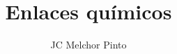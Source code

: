 \documentclass[12pt,addpoints,answers]{guia}
\title{Enlaces químicos}
\author{JC Melchor Pinto}
\begin{document}
\pagestyle{headandfoot}
\INFO
\printanswers
\begin{multicols}{2}
    
    
    
    
\end{multicols}%
\begin{questions}
    
\end{questions}
\end{document}

